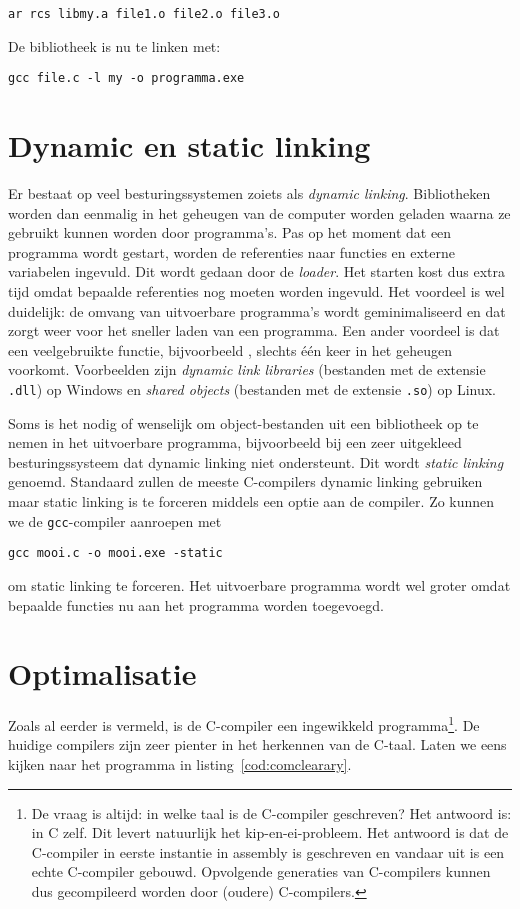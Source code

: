 \hspace*{1em}\texttt{ar rcs libmy.a file1.o file2.o file3.o}

De bibliotheek is nu te linken met:

\hspace*{1em}\texttt{gcc file.c -l my -o programma.exe}


\section{Dynamic en static linking}
Er bestaat op veel besturingssystemen zoiets als \textsl{dynamic linking}. Bibliotheken worden dan eenmalig in het geheugen van de computer worden geladen waarna ze gebruikt kunnen worden door programma's. Pas op het moment dat een programma wordt gestart, worden de referenties naar functies en externe variabelen ingevuld. Dit wordt gedaan door de \textsl{loader}. Het starten kost dus extra tijd omdat bepaalde referenties nog moeten worden ingevuld. Het voordeel is wel duidelijk: de omvang van uitvoerbare programma's wordt geminimaliseerd en dat zorgt weer voor het sneller laden van een programma. Een ander voordeel is dat een veelgebruikte functie, bijvoorbeeld , slechts één keer in het geheugen voorkomt. Voorbeelden zijn \textsl{dynamic link libraries} (bestanden met de extensie \texttt{.dll}) op Windows en \textsl{shared objects} (bestanden met de extensie \texttt{.so}) op Linux. 

Soms is het nodig of wenselijk om object-bestanden uit een bibliotheek op te nemen in het uitvoerbare programma, bijvoorbeeld bij een zeer uitgekleed besturingssysteem dat dynamic linking niet ondersteunt. Dit wordt \textsl{static linking} genoemd. Standaard zullen de meeste C-compilers dynamic linking gebruiken maar static linking is te forceren middels een optie aan de compiler. Zo kunnen we de \texttt{gcc}-compiler aanroepen met

\begin{lstlisting}[style=lstoneline]
gcc mooi.c -o mooi.exe -static
\end{lstlisting}

om static linking te forceren. Het uitvoerbare programma wordt wel groter omdat bepaalde functies nu aan het programma worden toegevoegd.


\section{Optimalisatie}
Zoals al eerder is vermeld, is de C-compiler een ingewikkeld programma\footnote{De vraag is altijd: in welke taal is de C-compiler geschreven? Het antwoord is: in C zelf. Dit levert natuurlijk het kip-en-ei-probleem. Het antwoord is dat de C-compiler in eerste instantie in assembly is geschreven en vandaar uit is een echte C-compiler gebouwd. Opvolgende generaties van C-compilers kunnen dus gecompileerd worden door (oudere) C-compilers.}. De huidige compilers zijn zeer pienter in het herkennen van de C-taal. Laten we eens kijken naar het programma in listing~\ref{cod:comclearary}.

